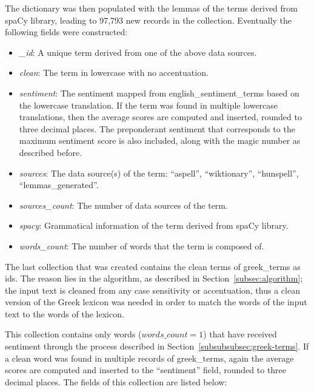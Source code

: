 The dictionary was then populated with the lemmas of the terms
derived from spaCy library, leading to 97,793 new records in the collection.
Eventually the following fields were constructed:

\begin{itemize}
 \item \emph{\_id}: A unique term derived from one of the above data sources.
 
 \item \emph{clean}: The term in lowercase with no accentuation.
 
 \item \emph{sentiment}: The sentiment mapped from english\_sentiment\_terms
 based on the lowercase translation.
 If the term was found in multiple lowercase translations,
 then the average scores are computed and inserted,
 rounded to three decimal places.
 The preponderant sentiment that corresponds to the maximum sentiment score
 is also included, along with the magic number as described before.
 
 \item \emph{sources}: The data source(s) of the term:
 ``aspell'', ``wiktionary'', ``hunspell'', ``lemmas\_generated''.
 
 \item \emph{sources\_count}: The number of data sources of the term.
 
 \item \emph{spacy}: Grammatical information of the term
 derived from spaCy library.
 
 \item \emph{words\_count}: The number of words that the term is composed of.
\end{itemize}

\label{subsubsubsec:greek-sentiment-terms}

The last collection that was created
contains the clean terms of greek\_terms as ids.
The reason lies in the algorithm,
as described in Section~\ref{subsec:algorithm};
the input text is cleaned from any case sensitivity or accentuation,
thus a clean version of the Greek lexicon was needed
in order to match the words of the input text to the words of the lexicon.

This collection contains only words ($words\_count = 1$)
that have received sentiment through the process
described in Section~\ref{subsubsubsec:greek-terms}.
If a clean word was found in multiple records of greek\_terms,
again the average scores are computed and inserted
to the ``sentiment'' field,
rounded to three decimal places.
The fields of this collection are listed below:

